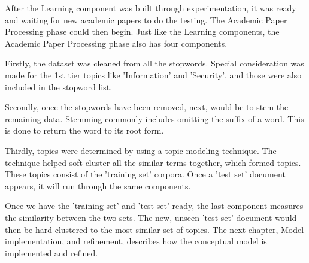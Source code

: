 After the Learning component was built through experimentation, it was ready and waiting for new academic papers to do the testing. The Academic Paper Processing phase could then begin. Just like the Learning components, the Academic Paper Processing phase also has four components. 

Firstly, the dataset was cleaned from all the stopwords. Special consideration was made for the 1st tier topics like 'Information' and 'Security', and those were also included in the stopword list. 

Secondly, once the stopwords have been removed, next, would be to stem the remaining data. Stemming commonly includes omitting the suffix of a word. This is done to return the word to its root form. 

Thirdly, topics were determined by using a topic modeling technique. The technique helped soft cluster all the similar terms together, which formed topics. These topics consist of the 'training set' corpora. Once a 'test set' document appears, it will run through the same components.

Once we have the 'training set' and 'test set' ready, the last component measures the similarity between the two sets. The new, unseen 'test set' document would then be hard clustered to the most similar set of topics. The next chapter, Model implementation, and refinement, describes how the conceptual model is implemented and refined.
